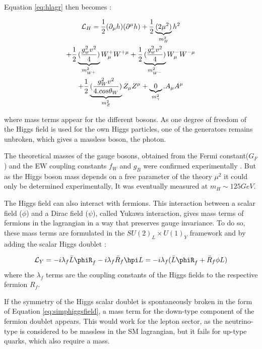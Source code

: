 Equation \ref{eq:hlagr} then becomes :

\begin{multline}
    \mathcal{L}_H = \frac{1}{2}(\partial_{\mu}h)(\partial^{\mu}h) + \frac{1}{2}\underbrace{(2\mu^2 )}_{m_{H}^2}h^2 \\ + \frac{1}{2} \underbrace{(\frac{g_{w}^2 v^2}{4})}_{m_{W^+}^2} W_{\mu}^+ W^{+\mu} + \frac{1}{2} \underbrace{(\frac{g_{w}^2 v^2}{4})}_{m_{W^-}^2} W_{\mu}^- W^{-\mu} \\ + \frac{1}{2} \underbrace{(\frac{g_W^2 v^2}{4.cos\theta_W})}_{m_Z^2} Z_{\mu} Z^{\mu} + \underbrace{0}_{m_{\gamma}^2}.A_{\mu}A^{\mu}
\end{multline} 

where mass terms appear for the different bosons. As one degree of freedom of the Higgs field is used for the own Higgs particles, one of the generators remains unbroken, which gives a massless boson, the photon.

The theoretical masses of the gauge bosons, obtained from the Fermi constant($G_F$) and the EW coupling constants $f_W$ and $g_B$ were confirmed experimentally \cite{ARNISON1983103,BANNER1983476,1983398,BAGNAIA1983130,Group:2008ds}. But as the Higgs boson mass depends on a free parameter of the theory $\mu^2$ it could only be determined experimentally, It was eventually measured at $m_H \sim 125 GeV$.\newline

The Higgs field can also interact with fermions. This interaction between a scalar field ($\phi$) and a Dirac field ($\psi$), called Yukawa interaction, gives mass terms of fermions in the lagrangian in a way that preserves gauge invariance. To do so, these mass terms are formulated in the $SU(2)_L \times U(1)_Y$ framework and by adding the scalar Higgs doublet :

\begin{equation}
    \Lagr_{Y} = -i\lambda_f \Bar{L}\phiR_f - i\lambda_f\Bar{R}_f \hpi L = -i\lambda_f (\Bar{L}\phiR_f + \Bar{R}_f \phi L)
\end{equation}
where the $\lambda_f$ terms are the coupling constants of the Higgs fields to the respective fermion $R_f$.

If the symmetry of the Higgs scalar doublet is spontaneously broken in the form of Equation \ref{eq:simphiggsfield}, a mass term for the down-type component of the fermion doublet appears. This would work for the lepton sector, as the neutrino-type is considered to be massless in the SM lagrangian, but it fails for up-type quarks, which also require a mass.

